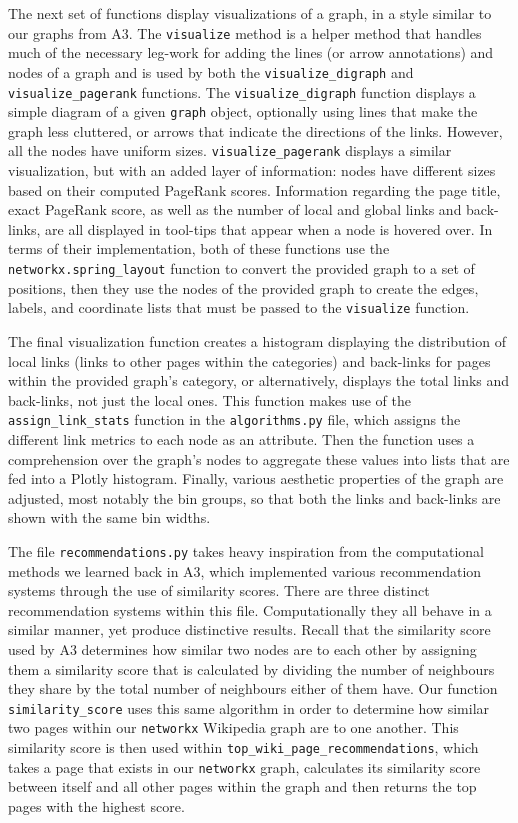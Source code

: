 \documentclass[fontsize=11pt]{article}
\begin{document}
The next set of functions display visualizations of a graph, in a style similar to our graphs from A3. The \texttt{visualize} method is a helper method that handles much of the necessary leg-work for adding the lines (or arrow annotations) and nodes of a graph and is used by both the \texttt{visualize\_digraph} and \texttt{visualize\_pagerank} functions. The \texttt{visualize\_digraph} function displays a simple diagram of a given \texttt{graph} object, optionally using lines that make the graph less cluttered, or arrows that indicate the directions of the links. However, all the nodes have uniform sizes. \texttt{visualize\_pagerank} displays a similar visualization, but with an added layer of information: nodes have different sizes based on their computed PageRank scores. Information regarding the page title, exact PageRank score, as well as the number of local and global links and back-links, are all displayed in tool-tips that appear when a node is hovered over. In terms of their implementation, both of these functions use the \texttt{networkx.spring\_layout} function to convert the provided graph to a set of positions, then they use the nodes of the provided graph to create the edges, labels, and coordinate lists that must be passed to the \texttt{visualize} function.

The final visualization function creates a histogram displaying the distribution of local links (links to other pages within the categories) and back-links for pages within the provided graph's category, or alternatively, displays the total links and back-links, not just the local ones. This function makes use of the \texttt{assign\_link\_stats} function in the \texttt{algorithms.py} file, which assigns the different link metrics to each node as an attribute. Then the function uses a comprehension over the graph's nodes to aggregate these values into lists that are fed into a Plotly histogram. Finally, various aesthetic properties of the graph are adjusted, most notably the bin groups, so that both the links and back-links are shown with the same bin widths.

The file \texttt{recommendations.py} takes heavy inspiration from the computational methods we learned back in A3, which implemented various recommendation systems through the use of similarity scores. There are three distinct recommendation systems within this file. Computationally they all behave in a similar manner, yet produce distinctive results. Recall that the similarity score used by A3 determines how similar two nodes are to each other by assigning them a similarity score that is calculated by dividing the number of neighbours they share by the total number of neighbours either of them have. Our function \texttt{similarity\_score} uses this same algorithm in order to determine how similar two pages within our \texttt{networkx} Wikipedia graph are to one another. This similarity score is then used within \texttt{top\_wiki\_page\_recommendations}, which takes a page that exists in our \texttt{networkx} graph, calculates its similarity score between itself and all other pages within the graph and then returns the top pages with the highest score. 
\end{document}
